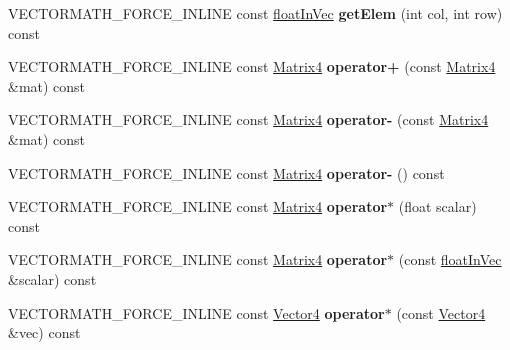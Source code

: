\begin{DoxyCompactItemize}
V\+E\+C\+T\+O\+R\+M\+A\+T\+H\+\_\+\+F\+O\+R\+C\+E\+\_\+\+I\+N\+L\+I\+NE const \hyperlink{classVectormath_1_1floatInVec}{float\+In\+Vec} {\bfseries get\+Elem} (int col, int row) const
\item 
\mbox{\label{classVectormath_1_1Aos_1_1Matrix4_a6d89608a7e82d5e97f6cd438ab17aaad}} 
V\+E\+C\+T\+O\+R\+M\+A\+T\+H\+\_\+\+F\+O\+R\+C\+E\+\_\+\+I\+N\+L\+I\+NE const \hyperlink{classVectormath_1_1Aos_1_1Matrix4}{Matrix4} {\bfseries operator+} (const \hyperlink{classVectormath_1_1Aos_1_1Matrix4}{Matrix4} \&mat) const
\item 
\mbox{\label{classVectormath_1_1Aos_1_1Matrix4_a615460f8f372b5ce6031f83ab02b18d8}} 
V\+E\+C\+T\+O\+R\+M\+A\+T\+H\+\_\+\+F\+O\+R\+C\+E\+\_\+\+I\+N\+L\+I\+NE const \hyperlink{classVectormath_1_1Aos_1_1Matrix4}{Matrix4} {\bfseries operator-\/} (const \hyperlink{classVectormath_1_1Aos_1_1Matrix4}{Matrix4} \&mat) const
\item 
\mbox{\label{classVectormath_1_1Aos_1_1Matrix4_ac46317ff5fdd1c7cec5366d6fb190f0c}} 
V\+E\+C\+T\+O\+R\+M\+A\+T\+H\+\_\+\+F\+O\+R\+C\+E\+\_\+\+I\+N\+L\+I\+NE const \hyperlink{classVectormath_1_1Aos_1_1Matrix4}{Matrix4} {\bfseries operator-\/} () const
\item 
\mbox{\label{classVectormath_1_1Aos_1_1Matrix4_a738b86812ce9dc86b949c73eee0453c0}} 
V\+E\+C\+T\+O\+R\+M\+A\+T\+H\+\_\+\+F\+O\+R\+C\+E\+\_\+\+I\+N\+L\+I\+NE const \hyperlink{classVectormath_1_1Aos_1_1Matrix4}{Matrix4} {\bfseries operator$\ast$} (float scalar) const
\item 
\mbox{\label{classVectormath_1_1Aos_1_1Matrix4_ad2dd8780c3131b8f46f53fd8c3cfaf11}} 
V\+E\+C\+T\+O\+R\+M\+A\+T\+H\+\_\+\+F\+O\+R\+C\+E\+\_\+\+I\+N\+L\+I\+NE const \hyperlink{classVectormath_1_1Aos_1_1Matrix4}{Matrix4} {\bfseries operator$\ast$} (const \hyperlink{classVectormath_1_1floatInVec}{float\+In\+Vec} \&scalar) const
\item 
\mbox{\label{classVectormath_1_1Aos_1_1Matrix4_a059505de18285bdbf1f7803b1cf78ece}} 
V\+E\+C\+T\+O\+R\+M\+A\+T\+H\+\_\+\+F\+O\+R\+C\+E\+\_\+\+I\+N\+L\+I\+NE const \hyperlink{classVectormath_1_1Aos_1_1Vector4}{Vector4} {\bfseries operator$\ast$} (const \hyperlink{classVectormath_1_1Aos_1_1Vector4}{Vector4} \&vec) const

\end{DoxyCompactItemize}
